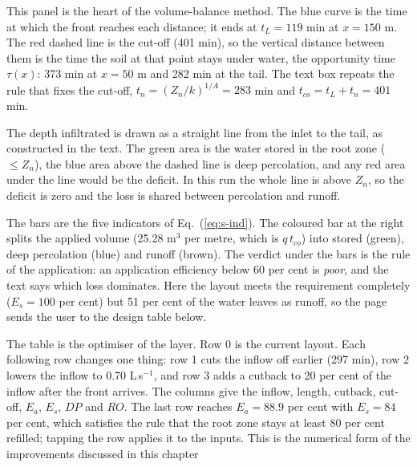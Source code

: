 
This panel is the heart of the volume-balance method. The blue curve is the time at which the front reaches each distance; it ends at $t_L=119$ min at $x=150$ m. The red dashed line is the cut-off (401 min), so the vertical distance between them is the time the soil at that point stays under water, the opportunity time $\tau(x)$: 373 min at $x=50$ m and 282 min at the tail. The text box repeats the rule that fixes the cut-off, $t_n=(Z_n/k)^{1/A}=283$ min and $t_{co}=t_L+t_n=401$ min.


The depth infiltrated is drawn as a straight line from the inlet to the tail, as constructed in the text. The green area is the water stored in the root zone ($\le Z_n$), the blue area above the dashed line is deep percolation, and any red area under the line would be the deficit. In this run the whole line is above $Z_n$, so the deficit is zero and the loss is shared between percolation and runoff.


The bars are the five indicators of Eq.~(\ref{eq:s-ind}). The coloured bar at the right splits the applied volume (25.28 m$^3$ per metre, which is $q\,t_{co}$) into stored (green), deep percolation (blue) and runoff (brown). The verdict under the bars is the rule of the application: an application efficiency below 60 per cent is \emph{poor}, and the text says which loss dominates. Here the layout meets the requirement completely ($E_s=100$ per cent) but 51 per cent of the water leaves as runoff, so the page sends the user to the design table below.


The table is the optimiser of the layer. Row 0 is the current layout. Each following row changes one thing: row 1 cuts the inflow off earlier (297 min), row 2 lowers the inflow to 0.70 L\,s$^{-1}$, and row 3 adds a cutback to 20 per cent of the inflow after the front arrives. The columns give the inflow, length, cutback, cut-off, $E_a$, $E_s$, $DP$ and $RO$. The last row reaches $E_a=88.9$ per cent with $E_s=84$ per cent, which satisfies the rule that the root zone stays at least 80 per cent refilled; tapping the row applies it to the inputs. This is the numerical form of the improvements discussed in this chapter

